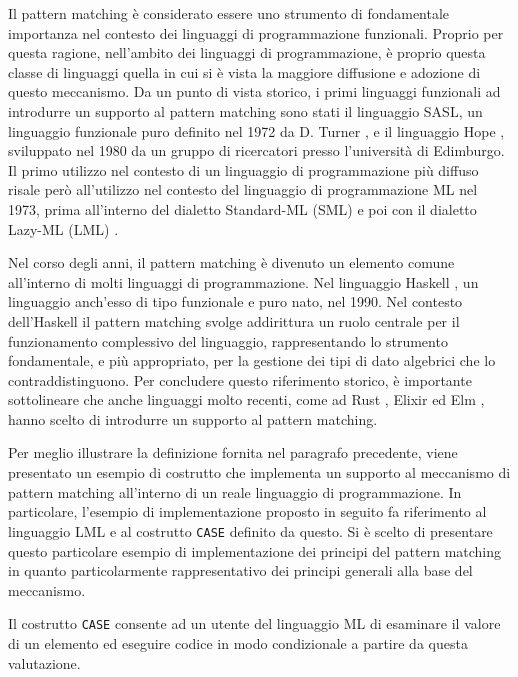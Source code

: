 Il pattern matching è considerato essere uno strumento di fondamentale
importanza nel contesto dei linguaggi di programmazione funzionali. Proprio per
questa ragione, nell’ambito dei linguaggi di programmazione, è proprio questa
classe di linguaggi quella in cui si è vista la maggiore diffusione e adozione
di questo meccanismo. Da un punto di vista storico, i primi linguaggi funzionali
ad introdurre un supporto al pattern matching sono stati il linguaggio SASL, un
linguaggio funzionale puro definito nel 1972 da D. Turner
\cite{DBLP:journals/spe/Turner79}, e il linguaggio Hope
\cite{DBLP:conf/lfp/BurstallMS80}, sviluppato nel 1980 da un gruppo di
ricercatori presso l'università di Edimburgo. Il primo utilizzo nel contesto di
un linguaggio di programmazione più diffuso risale però all’utilizzo nel
contesto del linguaggio di programmazione ML nel 1973, prima all’interno del
dialetto Standard-ML (SML) \cite{milner1997definition} e poi con il dialetto
Lazy-ML (LML) \cite{DBLP:conf/lfp/Augustsson84}.

Nel corso degli anni, il pattern matching è divenuto un elemento comune
all'interno di molti linguaggi di programmazione. Nel linguaggio Haskell
\cite{DBLP:conf/hopl/HudakHJW07}, un linguaggio anch'esso di tipo funzionale e
puro nato, nel 1990. Nel contesto dell'Haskell il pattern matching svolge
addirittura un ruolo centrale per il funzionamento complessivo del linguaggio,
rappresentando lo strumento fondamentale, e più appropriato, per la gestione dei
tipi di dato algebrici che lo contraddistinguono. Per concludere questo
riferimento storico, è importante sottolineare che anche linguaggi molto
recenti, come ad Rust \cite{rust2016}, Elixir \cite{laurent2014introducing} ed
Elm \cite{elm2016}, hanno scelto di introdurre un supporto al pattern
matching.

Per meglio illustrare la definizione fornita nel paragrafo precedente, viene
presentato un esempio di costrutto che implementa un supporto al meccanismo di
pattern matching all'interno di un reale linguaggio di programmazione. In
particolare, l'esempio di implementazione proposto in seguito fa riferimento al
linguaggio LML e al costrutto \texttt{CASE} definito da questo. Si è scelto di
presentare questo particolare esempio di implementazione dei principi del
pattern matching in quanto particolarmente rappresentativo dei principi generali
alla base del meccanismo.

Il costrutto \texttt{CASE} consente ad un utente del linguaggio ML di esaminare
il valore di un elemento ed eseguire codice in modo condizionale a partire da
questa valutazione.

